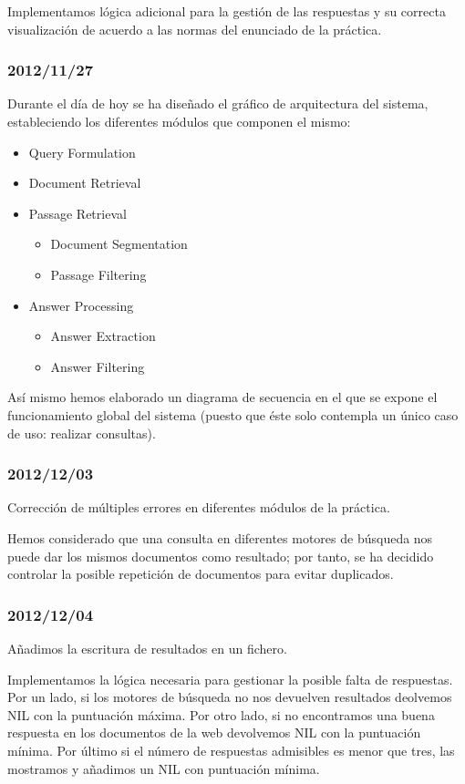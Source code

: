 \documentclass[12pt,a4paper,titlepage]{article}
\begin{document}
Implementamos lógica adicional para la gestión de las respuestas y su correcta visualización de acuerdo a las normas del enunciado de la práctica.

\subsubsection*{2012/11/27}
Durante el día de hoy se ha diseñado el gráfico de arquitectura del sistema, estableciendo los diferentes módulos que componen el mismo:

\begin{itemize}
\item Query Formulation 
\item Document Retrieval
\item Passage Retrieval
	\begin{itemize}
	\item Document Segmentation
	\item Passage Filtering 
	\end{itemize}
\item Answer Processing
	\begin{itemize}
	\item Answer Extraction
	\item Answer Filtering
	\end{itemize}
\end{itemize}

Así mismo hemos elaborado un diagrama de secuencia en el que se expone el funcionamiento global del sistema (puesto que éste solo contempla un único caso de uso: realizar consultas).

\subsubsection*{2012/12/03}
Corrección de múltiples errores en diferentes módulos de la práctica.

Hemos considerado que una consulta en diferentes motores de búsqueda nos puede dar los mismos documentos como resultado; por tanto, se ha decidido controlar la posible repetición de documentos para evitar duplicados.

\subsubsection*{2012/12/04}
Añadimos la escritura de resultados en un fichero.

Implementamos la lógica necesaria para gestionar la posible falta de respuestas. Por un lado, si los motores de búsqueda no nos devuelven resultados deolvemos NIL con la puntuación máxima. Por otro lado, si no encontramos una buena respuesta en los documentos de la web devolvemos NIL con la puntuación mínima. Por último si el número de respuestas admisibles es menor que tres, las mostramos y añadimos un NIL con puntuación mínima.
\end{document}

